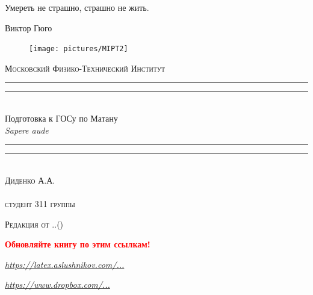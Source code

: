 \newpage
\thispagestyle{empty}
\begingroup
{}
\epigraph{Умереть не страшно, страшно не жить.}{Виктор Гюго}\centering
\settowidth{\unitlength}{\LARGE\scshape Московский Физико-Технический Институт}

\begin{figure}[!h]
\center
\texttt{[image: pictures/MIPT2]}
\end{figure}
\vspace*{\baselineskip}
{\LARGE\scshape Московский Физико-Технический Институт}\\[\baselineskip]
\rule{\unitlength}{1.6pt}\vspace*{-\baselineskip}\vspace*{2pt}
\rule{\unitlength}{0.4pt}\\[1.8\baselineskip]
{\Huge Подготовка к ГОСу по Матану}\\[\baselineskip]
{\large \itshape Sapere aude}\\[0.7\baselineskip]
\rule{\unitlength}{0.4pt}\vspace*{-\baselineskip}\vspace{3.2pt}
\rule{\unitlength}{1.6pt}\\[\baselineskip]
{\Large\scshape Диденко А.А. \\ $ $\\студент 311 группы}\par
\vspace*{1.5\baselineskip}  


{\LARGE\scshape Редакция от \twodigit\day.\twodigit\month.\the\year \;(\currenttime)}\par %

\mbox{}

\textcolor{red}{\huge \textbf{Обновляйте книгу по этим ссылкам!}}

\vspace*{0.5\baselineskip} 

\href{http://latex.aslushnikov.com/compile?git=https://github.com/DidenkoAndre/GOS_book&target=_main.tex}{\large \textcolor{Purplemountainmajesty}{\textit{https://latex.aslushnikov.com/...}}}

\vspace*{0.5\baselineskip} 

\href{https://www.dropbox.com/sh/7e5mfj8q68o2ipp/AAD8XvpZhiJzFbEh_IeH305ia?dl=0&preview=GOSBook.pdf}{\large \textcolor{Purplemountainmajesty}{\textit{https://www.dropbox.com/...}}}

